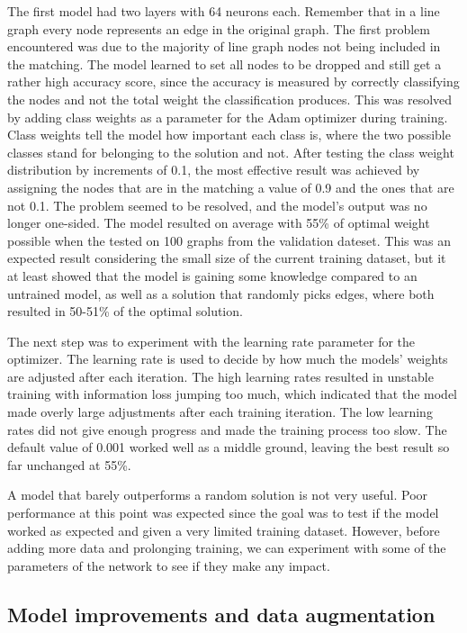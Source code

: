 The first model had two layers with 64 neurons each. Remember that in a line graph every node represents an edge in the original graph. The first problem encountered was due to the majority of line graph nodes not being included in the matching. The model learned to set all nodes to be dropped and still get a rather high accuracy score, since the accuracy is measured by correctly classifying the nodes and not the total weight the classification produces. This was resolved by adding class weights as a parameter for the Adam optimizer during training. Class weights tell the model how important each class is, where the two possible classes stand for belonging to the solution and not. After testing the class weight distribution by increments of 0.1, the most effective result was achieved by assigning the nodes that are in the matching a value of 0.9 and the ones that are not 0.1. The problem seemed to be resolved, and the model's output was no longer one-sided. The model resulted on average with 55\% of optimal weight possible when the tested on 100 graphs from the validation dateset. This was an expected result considering the small size of the current training dataset, but it at least showed that the model is gaining some knowledge compared to an untrained model, as well as a solution that randomly picks edges, where both resulted in 50-51\% of the optimal solution. 

The next step was to experiment with the learning rate parameter for the optimizer. The learning rate is used to decide by how much the models' weights are adjusted after each iteration. The high learning rates resulted in unstable training with information loss jumping too much, which indicated that the model made overly large adjustments after each training iteration. The low learning rates did not give enough progress and made the training process too slow. The default value of 0.001 worked well as a middle ground, leaving the best result so far unchanged at 55\%.

A model that barely outperforms a random solution is not very useful. Poor performance at this point was expected since the goal was to test if the model worked as expected and given a very limited training dataset. However, before adding more data and prolonging training, we can experiment with some of the parameters of the network to see if they make any impact.

\subsection{Model improvements and data augmentation}

